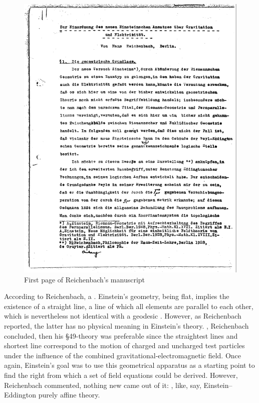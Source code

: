 \documentclass[final]{article}
\newcommand{\manu}[1]{\citep[#1]{Reichenbach1928b}}
\begin{document}
\begin{figure}
\centering
\includegraphics[scale=0.3]{1928ReichebachTele.png}
\caption{\label{fig:reichenbachfirst} First page of Reichenbach's manuscript \citep{Reichenbach1928b}}
\end{figure}

According to Reichenbach, a  \manu{7}. Einstein's geometry, being flat, implies the existence of a straight line, a line of which all elements are parallel to each other, which is nevertheless not identical with a geodesic \citep[224]{Einstein19282}. However, as Reichenbach reported, the latter has no physical meaning in Einstein's theory. , Reichenbach concluded, then his \S49-theory was preferable since the straightest lines and shortest line correspond to the motion of charged and uncharged test particles under the influence of the combined gravitational-electromagnetic field. Once again, Einstein's goal was to use this geometrical apparatus as a starting point to find the right  from which a set of field equations could be derived. However, Reichenbach commented, nothing new came out of it:  \manu{6}, like, say, Einstein--Eddington purely affine theory. 
\end{document}
